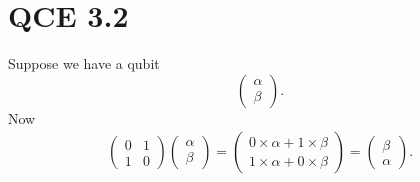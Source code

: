 \documentclass[10pt]{article}
\begin{document}
\section*{QCE 3.2}
Suppose we have a qubit 
\[
\begin{pmatrix}
\alpha \\
\beta
\end{pmatrix}.
\]
Now 
\begin{align*}
\begin{pmatrix}
0 & 1 \\
1 & 0 
\end{pmatrix}
\begin{pmatrix}
\alpha \\
\beta
\end{pmatrix} = 
\begin{pmatrix}
0 \times \alpha + 1 \times \beta \\
1 \times \alpha + 0 \times \beta
\end{pmatrix} = 
\begin{pmatrix}
\beta \\
\alpha
\end{pmatrix}.
\end{align*}
\end{document}
